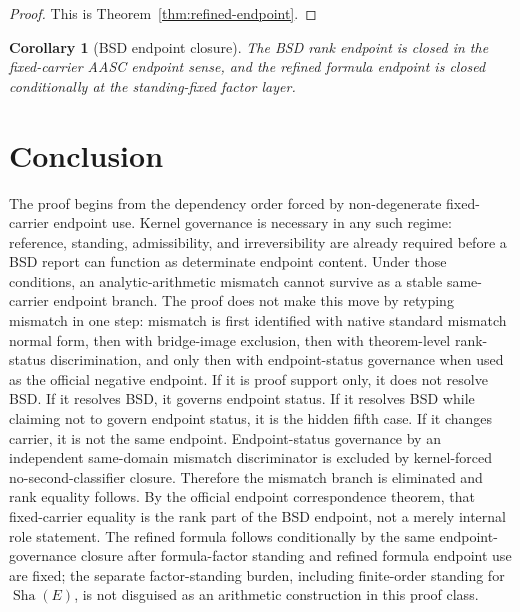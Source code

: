 \documentclass[11pt]{article}
\newtheorem{corollary}[theorem]{Corollary}
\newcommand{\Sha}{\operatorname{Sha}}
\begin{document}
\begin{proof}
This is Theorem~\ref{thm:refined-endpoint}.
\end{proof}

\begin{corollary}[BSD endpoint closure]
The BSD rank endpoint is closed in the fixed-carrier AASC endpoint sense, and the refined formula endpoint is closed conditionally at the standing-fixed factor layer.
\end{corollary}

\section*{Conclusion}
The proof begins from the dependency order forced by non-degenerate fixed-carrier endpoint use. Kernel governance is necessary in any such regime: reference, standing, admissibility, and irreversibility are already required before a BSD report can function as determinate endpoint content. Under those conditions, an analytic-arithmetic mismatch cannot survive as a stable same-carrier endpoint branch. The proof does not make this move by retyping mismatch in one step: mismatch is first identified with native standard mismatch normal form, then with bridge-image exclusion, then with theorem-level rank-status discrimination, and only then with endpoint-status governance when used as the official negative endpoint. If it is proof support only, it does not resolve BSD. If it resolves BSD, it governs endpoint status. If it resolves BSD while claiming not to govern endpoint status, it is the hidden fifth case. If it changes carrier, it is not the same endpoint. Endpoint-status governance by an independent same-domain mismatch discriminator is excluded by kernel-forced no-second-classifier closure. Therefore the mismatch branch is eliminated and rank equality follows. By the official endpoint correspondence theorem, that fixed-carrier equality is the rank part of the BSD endpoint, not a merely internal role statement. The refined formula follows conditionally by the same endpoint-governance closure after formula-factor standing and refined formula endpoint use are fixed; the separate factor-standing burden, including finite-order standing for $\Sha(E)$, is not disguised as an arithmetic construction in this proof class.

\appendix
\end{document}

